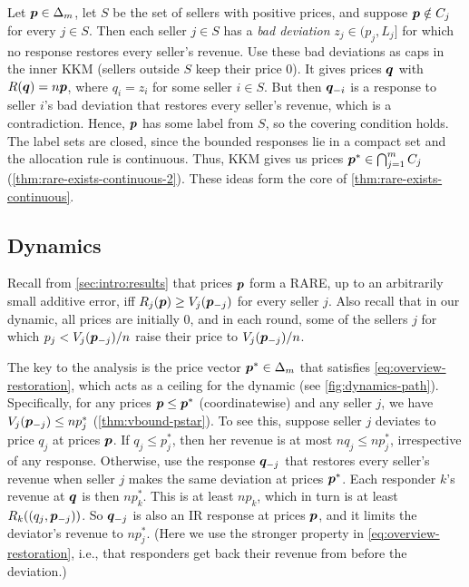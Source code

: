Let $\bm{p} \in \Delta_m$, let $S$ be the set of sellers with positive prices,
and suppose $\bm{p} \notin C_j$ for every $j \in S$.
Then each seller $j \in S$ has a \emph{bad deviation} $z_j \in (p_j, L_j]$
for which no response restores every seller's revenue.
Use these bad deviations as caps in the inner KKM (sellers outside $S$ keep their price 0).
It gives prices $\bm{q}$ with $R(\bm{q}) = n\bm{p}$, where $q_i = z_i$ for some seller $i \in S$.
But then $\bm{q}_{-i}$ is a response to seller $i$'s bad deviation that restores every seller's revenue,
which is a contradiction.
Hence, $\bm{p}$ has some label from $S$, so the covering condition holds.
The label sets are closed, since the bounded responses lie in a compact set
and the allocation rule is continuous.
Thus, KKM gives us prices $\bm{p}^* \in \bigcap_{j=1}^m C_j$ (\cref{thm:rare-exists-continuous-2}).
These ideas form the core of \cref{thm:rare-exists-continuous}.

\subsection{Dynamics}
\label{sec:overview:dynamics}

Recall from \cref{sec:intro:results} that prices $\bm{p}$ form a RARE,
up to an arbitrarily small additive error,
iff $R_j(\bm{p}) \ge V_j(\bm{p}_{-j})$ for every seller $j$.
Also recall that in our dynamic, all prices are initially 0,
and in each round, some of the sellers $j$ for which $p_j < V_j(\bm{p}_{-j})/n$
raise their price to $V_j(\bm{p}_{-j})/n$.

The key to the analysis is the price vector $\bm{p}^* \in \Delta_m$
that satisfies \cref{eq:overview-restoration}, which acts as a ceiling for the dynamic
(see \cref{fig:dynamics-path}).
Specifically, for any prices $\bm{p} \le \bm{p}^*$ (coordinatewise) and any seller $j$,
we have $V_j(\bm{p}_{-j}) \le np^*_j$ (\cref{thm:vbound-pstar}).
To see this, suppose seller $j$ deviates to price $q_j$ at prices $\bm{p}$.
If $q_j \le p^*_j$, then her revenue is at most $nq_j \le np^*_j$, irrespective of any response.
Otherwise, use the response $\bm{q}_{-j}$ that restores every seller's revenue
when seller $j$ makes the same deviation at prices $\bm{p}^*$.
Each responder $k$'s revenue at $\bm{q}$ is then $np^*_k$.
This is at least $np_k$, which in turn is at least $R_k((q_j, \bm{p}_{-j}))$.
So $\bm{q}_{-j}$ is also an IR response at prices $\bm{p}$,
and it limits the deviator's revenue to $np^*_j$.
(Here we use the stronger property in \cref{eq:overview-restoration},
i.e., that responders get back their revenue from before the deviation.)

